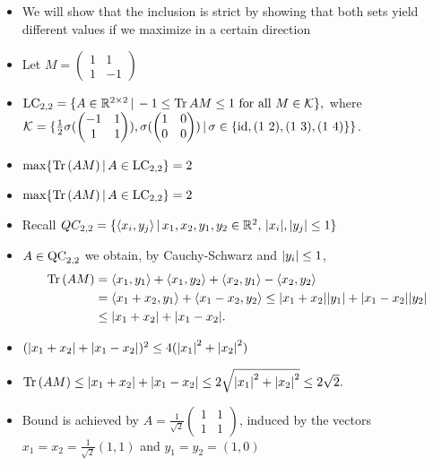 \begin{frame}
	\begin{itemize}
		\item<1-> We will show that the inclusion is strict by showing that both sets yield different values if we maximize in a certain direction
		\item<2-> Let $M = \begin{pmatrix}
		1 & 1 \\ 1 & -1 
		\end{pmatrix} $
		\item <3-> {\footnotesize  $
			\textup{LC}_{2,2} = \{ A \in \mathbb{R}^{2 \times 2} \, | \, -1 \le  \textup{Tr} \, {AM}  \le 1 \textup{ for all } M \in \mathcal{K} \},
			$
			where $ \mathcal{K}  = \{ \frac{1}{2}\sigma(\begin{pmatrix}
			-1 & 1 \\
			1 & 1
			\end{pmatrix}), \sigma(\begin{pmatrix}
			1 & 0 \\
			0 & 0
			\end{pmatrix}) \, | \,  \sigma \in \{ \textup{id}, (1 \, \, 2), (1 \, \, 3), (1 \, \, 4) \} \} $.}
		\item<3-> $ \max \{  \textup{Tr} \, {(AM)} \, | \, A \in \textup{LC}_{2,2} \} = 2 $
			 
		
	\end{itemize}
\end{frame}

\begin{frame}
\begin{itemize}
	\item<1-> {\footnotesize $ \max \{  \textup{Tr} \, {(AM)} \, | \, A \in \textup{LC}_{2,2} \} = 2 $ }
	\item<2-> Recall $ QC_{2,2} = \{ \langle x_i,y_j \rangle \, | \, x_1,x_2,y_1,y_2 \in \mathbb{R}^2, \, {\left|{x_i}\right|},{\left|{y_j}\right|} \le 1 \} $
	\item <4->$ A \in \textup{QC}_{2,2} $ we obtain, by Cauchy-Schwarz and $ {\left|{y_i}\right|}\le 1 $,
	\begin{align*}
	\textup{Tr} \, {(AM)} &= \langle x_1,y_1 \rangle + \langle x_1,y_2 \rangle + \langle x_2,y_1 \rangle - \langle x_2,y_2 \rangle   \\
	&= \langle x_1+x_2,y_1 \rangle + \langle x_1-x_2,y_2 \rangle  \le {\left|{x_1+x_2}\right|}{\left|{y_1}\right|} + {\left|{x_1-x_2}\right|}{\left|{y_2}\right|}  \\
	&\le {\left|{x_1+x_2}\right|} + {\left|{x_1-x_2}\right|}.
	\end{align*} 
	\item<5-> $({\left|{x_1+x_2}\right|} + {\left|{x_1-x_2}\right|})^2 \le  4({\left|{x_1}\right|}^2+{\left|{x_2}\right|}^2) $
	\item<6-> $\textup{Tr} \, {(AM)}  \le {\left|{x_1+x_2}\right|} + {\left|{x_1-x_2}\right|} \le 2\sqrt{{\left|{x_1}\right|}^2+{\left|{x_2}\right|}^2} \le 2 \sqrt{2}. $
	\item<7-> Bound is achieved by  $ A = \frac{1}{\sqrt{2}}\begin{pmatrix}
	1 & 1 \\ 1 & 1 
	\end{pmatrix} $, induced by the vectors $ x_1 = x_2 = \frac{1}{\sqrt{2}}(1,1) $ and $ y_1 = y_2 =(1,0) $
\end{itemize}
\end{frame}




